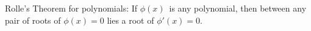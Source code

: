 Rolle's Theorem for polynomials: If $\phi(x)$~is any polynomial,
then between any pair of roots of $\phi(x) = 0$ lies a root of $\phi'(x) = 0$.

